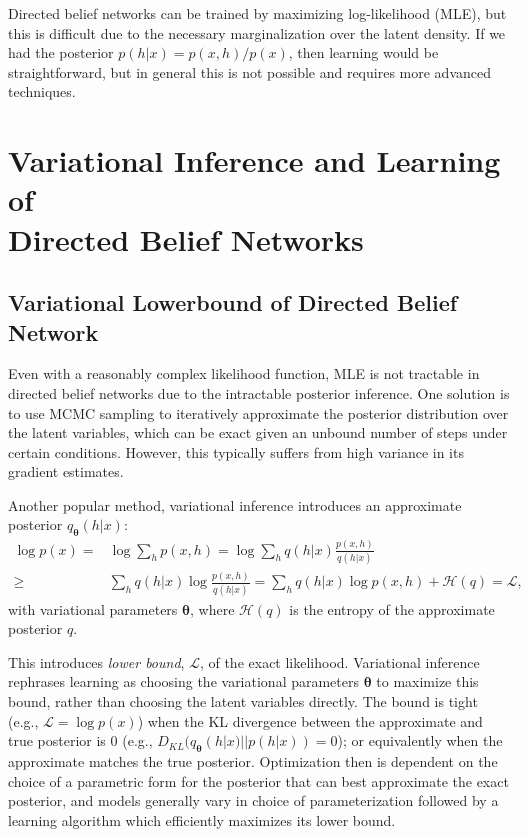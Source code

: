\documentclass{article} %
\newcommand{\vects}[1]{\boldsymbol{#1}}
\newcommand{\TT}[0]{\vects{\theta}}
\newcommand{\LL}[0]{\mathcal{L}}
\newcommand{\HH}[0]{\mathcal{H}}
\begin{document}
Directed belief networks can be trained by maximizing log-likelihood (MLE), but
this is difficult due to the necessary marginalization over the latent density.
If we had the posterior $p(h|x) = p(x, h) / p(x)$, then learning would be straightforward,
but in general this is not possible and requires more advanced
techniques. 

\section{Variational Inference and Learning of \\ Directed Belief Networks}

\subsection{Variational Lowerbound of Directed Belief Network}

Even with a reasonably complex likelihood function, MLE is not tractable in
directed belief networks due to the intractable posterior inference.  One
solution is to use MCMC sampling to iteratively approximate the posterior
distribution over the latent variables, which can be exact given an unbound number
of steps under certain conditions. However, this typically suffers from high variance in its
gradient estimates.

Another popular method, variational inference introduces an approximate
posterior $q_{\TT}(h|x)$:
\begin{align}
    \label{eq:approx_logp}
    \log p(x) =& \log \sum_{h} p(x, h) 
    = \log \sum_h q(h|x) \frac{p(x, h)}{q(h|x)} \nonumber \\
    \geq& \sum_h q(h|x) \log \frac{p(x, h)}{q(h|x)} 
    = \sum_h q(h|x) \log p(x,h) + \HH(q) = \LL,
\end{align}
with variational parameters $\TT$, where $\HH(q)$ is the entropy of the
approximate posterior $q$. 

This introduces \emph{lower bound}, $\LL$, of the exact likelihood. Variational
inference rephrases learning as choosing the variational parameters $\TT$ to
maximize this bound, rather than choosing the latent variables directly. The
bound is tight (e.g., $\LL = \log p(x)$) when the KL divergence between the
approximate and true posterior is $0$ (e.g., $D_{KL}(q_{\TT}(h|x)||p(h|x)) =
0$); or equivalently when the approximate matches the true posterior.
Optimization then is dependent on the choice of a parametric form for the
posterior that can best approximate the exact posterior, and models generally
vary in choice of parameterization followed by a learning algorithm which
efficiently maximizes its lower bound.
\end{document}
